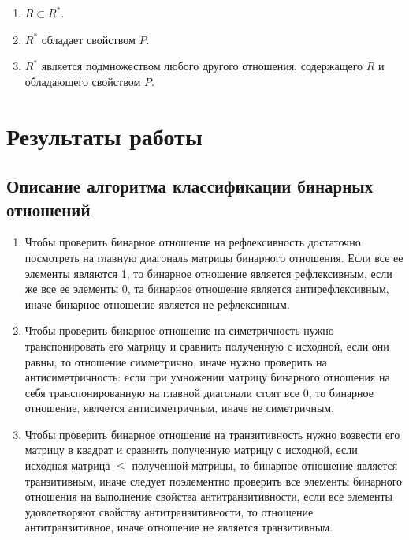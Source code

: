 \documentclass[spec, och, labwork]{shiza}
\begin{document}
        \begin{enumerate}
            \item $R \subset R^*$.
            \item $R^*$ обладает свойством $P$.
            \item $R^*$ является подмножеством любого другого отношения, содержащего $R$ и обладающего свойством $P$.
        \end{enumerate}

\section{Результаты работы}

        \subsection{Описание алгоритма классификации бинарных отношений}
            \begin{enumerate}
                \item Чтобы проверить бинарное отношение на рефлексивность достаточно посмотреть на главную
                диагональ матрицы бинарного отношения. Если все ее элементы являются 1, то бинарное отношение
                является рефлексивным, если же все ее элементы 0, та бинарное отношение является антирефлексивным,
                иначе бинарное отношение является не рефлексивным.
                \item Чтобы проверить бинарное отношение на симетричность нужно транспонировать его матрицу и сравнить
                полученную с исходной, если они равны, то отношение симметрично, иначе нужно проверить на антисиметричность:
                если при умножении матрицу бинарного отношения на себя транспонированную на главной диагонали стоят все 0, 
                то бинарное отношение, явлчется антисиметричным, иначе не симетричным.
                \item Чтобы проверить бинарное отношение на транзитивность нужно возвести его матрицу в квадрат и
                сравнить полученную матрицу с исходной, если исходная матрица $\leq$ полученной матрицы, то бинарное
                отношение является транзитивным, иначе следует поэлементно проверить все элементы бинарного отношения
                на выполнение свойства антитранзитивности, если все элементы удовлетворяют свойству антитранзитивности,
                то отношение антитранзитивное, иначе отношение не является транзитивным.
            \end{enumerate}
\end{document}
